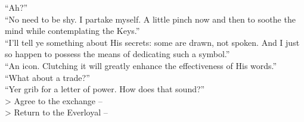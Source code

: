 “Ah?”\\

“No need to be shy. I partake myself. A little pinch now and then to soothe the mind while contemplating the Keys.”\\

“I’ll tell ye something about His secrets: some are drawn, not spoken. And I just so happen to possess the means of dedicating such a symbol.”\\

“An icon. Clutching it will greatly enhance the effectiveness of His words.”\\

“What about a trade?”\\

“Yer grib for a letter of power. How does that sound?”\\

> Agree to the exchange -- \\
> Return to the Everloyal -- 